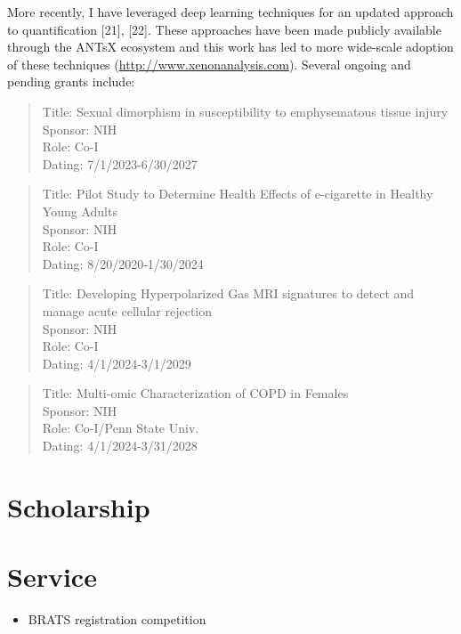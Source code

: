 \documentclass[
  11pt,
]{article}
\providecommand{\tightlist}{%
  \setlength{\itemsep}{0pt}\setlength{\parskip}{0pt}}
\begin{document}
More recently, I have leveraged deep learning techniques for an updated
approach to quantification {[}21{]}, {[}22{]}. These approaches have
been made publicly available through the ANTsX ecosystem and this work
has led to more wide-scale adoption of these techniques
(\url{http://www.xenonanalysis.com}). Several ongoing and pending grants
include:

\begin{quote}
Title: Sexual dimorphism in susceptibility to emphysematous tissue
injury\\
Sponsor: NIH\\
Role: Co-I\\
Dating: 7/1/2023-6/30/2027
\end{quote}

\begin{quote}
Title: Pilot Study to Determine Health Effects of e-cigarette in Healthy
Young Adults\\
Sponsor: NIH\\
Role: Co-I\\
Dating: 8/20/2020-1/30/2024
\end{quote}

\begin{quote}
Title: Developing Hyperpolarized Gas MRI signatures to detect and manage
acute cellular rejection\\
Sponsor: NIH\\
Role: Co-I\\
Dating: 4/1/2024-3/1/2029
\end{quote}

\begin{quote}
Title: Multi-omic Characterization of COPD in Females\\
Sponsor: NIH\\
Role: Co-I/Penn State Univ.\\
Dating: 4/1/2024-3/31/2028
\end{quote}

\hypertarget{scholarship}{%
\section{Scholarship}\label{scholarship}}

\hypertarget{service}{%
\section{Service}\label{service}}

\begin{itemize}
\tightlist
\item
  BRATS registration competition
\end{itemize}
\end{document}
